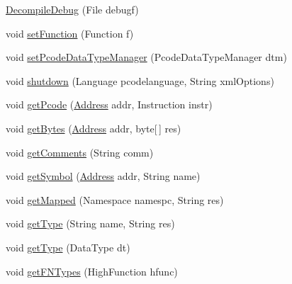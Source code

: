 \begin{DoxyCompactItemize}
\item 
\mbox{\hyperlink{classghidra_1_1app_1_1decompiler_1_1_decompile_debug_a01d165ce7cf1a7eb23f6443bd7368a7f}{Decompile\+Debug}} (File debugf)
\item 
void \mbox{\hyperlink{classghidra_1_1app_1_1decompiler_1_1_decompile_debug_a196b658ef48897a8bf587ef0a77eca01}{set\+Function}} (Function f)
\item 
void \mbox{\hyperlink{classghidra_1_1app_1_1decompiler_1_1_decompile_debug_a283a808d549422575132ef4e1aaafaea}{set\+Pcode\+Data\+Type\+Manager}} (Pcode\+Data\+Type\+Manager dtm)
\item 
void \mbox{\hyperlink{classghidra_1_1app_1_1decompiler_1_1_decompile_debug_a31d7bdb71f9cc5554a4c06d433e806d0}{shutdown}} (Language pcodelanguage, String xml\+Options)
\item 
void \mbox{\hyperlink{classghidra_1_1app_1_1decompiler_1_1_decompile_debug_a3ecedafa761807dad9dc91be7b6e0e27}{get\+Pcode}} (\mbox{\hyperlink{class_address}{Address}} addr, Instruction instr)
\item 
void \mbox{\hyperlink{classghidra_1_1app_1_1decompiler_1_1_decompile_debug_abbbb57329ae69cd3bf3dee407fa190e9}{get\+Bytes}} (\mbox{\hyperlink{class_address}{Address}} addr, byte\mbox{[}$\,$\mbox{]} res)
\item 
void \mbox{\hyperlink{classghidra_1_1app_1_1decompiler_1_1_decompile_debug_a5ac171ab08ec9d831e20fb532208c1f4}{get\+Comments}} (String comm)
\item 
void \mbox{\hyperlink{classghidra_1_1app_1_1decompiler_1_1_decompile_debug_a22f376783b458dd183febc07c79e9243}{get\+Symbol}} (\mbox{\hyperlink{class_address}{Address}} addr, String name)
\item 
void \mbox{\hyperlink{classghidra_1_1app_1_1decompiler_1_1_decompile_debug_abb217fc29ef7820e2f5537d44f33617f}{get\+Mapped}} (Namespace namespc, String res)
\item 
void \mbox{\hyperlink{classghidra_1_1app_1_1decompiler_1_1_decompile_debug_aeb72d2bb607448992b312f1b6b8c32b7}{get\+Type}} (String name, String res)
\item 
void \mbox{\hyperlink{classghidra_1_1app_1_1decompiler_1_1_decompile_debug_ad50cd2ada387faea599ecd97f32a6e0c}{get\+Type}} (Data\+Type dt)
\item 
void \mbox{\hyperlink{classghidra_1_1app_1_1decompiler_1_1_decompile_debug_a776b1bd42991b6e34f93bc0fc3dff45f}{get\+F\+N\+Types}} (High\+Function hfunc)
\item 

\end{DoxyCompactItemize}
